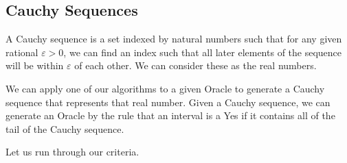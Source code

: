 \documentclass[12pt]{article}
\theoremstyle{remark}
\begin{document}
\subsection{Cauchy Sequences}

A Cauchy sequence is a set indexed by natural numbers such that for any given rational $\varepsilon > 0$, we can find an index such that all later elements of the sequence will be within $\varepsilon$ of each other. We can consider these as the real numbers. 

We can apply one of our algorithms to a given Oracle to generate a Cauchy sequence that represents that real number. Given a Cauchy sequence, we can generate an Oracle by the rule that an interval is a Yes if it contains all of the tail of the Cauchy sequence. 

Let us run through our criteria. 
\end{document}
